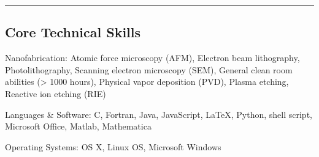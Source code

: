 \documentclass[10pt,letterpaper]{article}
\newenvironment{indentsection}[1]%
{\begin{list}{}%
	{\setlength{\leftmargin}{#1}}%
	\item[]%
}
{\end{list}}
\newcommand{\CPP}
{C\nolinebreak[4]\hspace{-.05em}\raisebox{.22ex}{\footnotesize\bf ++}}
\begin{document}
\hrule
\vspace{-0.4em}
\subsection*{Core Technical Skills}

\begin{indentsection}{\parindent}
\begin{description*}
	\item[Nanofabrication:]
	Atomic force microscopy (AFM), Electron beam lithography, Photolithography, Scanning electron microscopy (SEM), General clean room abilities (> 1000 hours), Physical vapor deposition (PVD), Plasma etching, Reactive ion etching (RIE)
	\item[Languages \& Software:]
	\CPP, Fortran, Java, JavaScript, \LaTeX, Python, shell script, Microsoft Office, Matlab, Mathematica
	\item[Operating Systems:]
	OS X, Linux OS, Microsoft Windows
\end{description*}
\end{indentsection}
\end{document}

